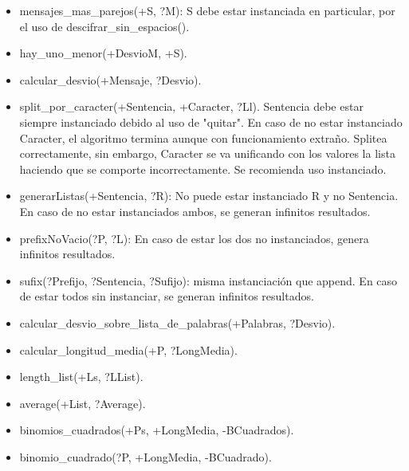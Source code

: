 \documentclass[spanish, 10pt,a4paper]{article}
\numberwithin{equation}{section} %
\begin{document}
\begin{itemize}
\item mensajes\_mas\_parejos(+S, ?M): S debe estar instanciada en particular, por el uso de descifrar\_sin\_espacios(). 
\item hay\_uno\_menor(+DesvioM, +S).
\item calcular\_desvio(+Mensaje, ?Desvio).
\item split\_por\_caracter(+Sentencia, +Caracter, ?Ll).
Sentencia debe estar siempre instanciado debido al uso de "quitar". En caso de no estar instanciado Caracter, el algoritmo termina aunque con funcionamiento extraño.
 Splitea correctamente, sin embargo, Caracter se va unificando con los valores la lista haciendo que se comporte incorrectamente. Se recomienda uso instanciado.
\item generarListas(+Sentencia, ?R): No puede estar instanciado R y no Sentencia. En caso de no estar instanciados ambos, se generan infinitos resultados. 
\item prefixNoVacio(?P, ?L): En caso de estar los dos no instanciados, genera infinitos resultados.
\item sufix(?Prefijo, ?Sentencia, ?Sufijo): misma instanciación que append. En caso de estar todos sin instanciar, se generan infinitos resultados.
\item calcular\_desvio\_sobre\_lista\_de\_palabras(+Palabras, ?Desvio).
\item calcular\_longitud\_media(+P, ?LongMedia).
\item length\_list(+Ls, ?LList).
\item average(+List, ?Average).
\item binomios\_cuadrados(+Ps, +LongMedia, -BCuadrados).
\item binomio\_cuadrado(?P, +LongMedia, -BCuadrado).  
\end{itemize}
\end{document}
